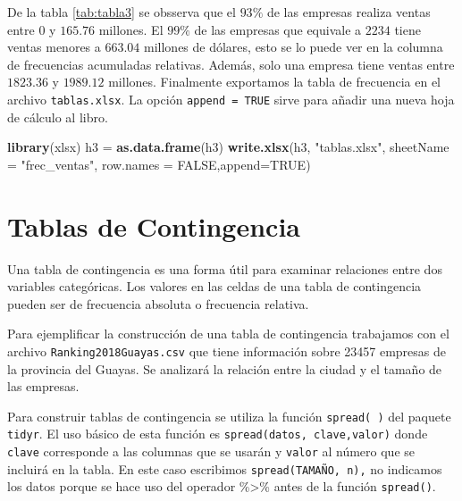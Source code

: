 \documentclass[
]{krantz}
\makeatletter
\newenvironment{Shaded}{\begin{snugshade}}{\end{snugshade}}
\newcommand{\DataTypeTok}[1]{\textcolor[rgb]{0.27,0.27,0.27}{#1}}
\newcommand{\KeywordTok}[1]{\textcolor[rgb]{0.27,0.27,0.27}{\textbf{#1}}}
\newcommand{\NormalTok}[1]{#1}
\newcommand{\OtherTok}[1]{\textcolor[rgb]{0.37,0.37,0.37}{#1}}
\newcommand{\StringTok}[1]{\textcolor[rgb]{0.5,0.5,0.5}{#1}}
\newenvironment{kframe}{%
\medskip{}
\setlength{\fboxsep}{.8em}
 \def\at@end@of@kframe{}%
 \ifinner\ifhmode%
  \def\at@end@of@kframe{\end{minipage}}%
  \begin{minipage}{\columnwidth}%
 \fi\fi%
 \def\FrameCommand##1{\hskip\@totalleftmargin \hskip-\fboxsep
 \colorbox{shadecolor}{##1}\hskip-\fboxsep
     \hskip-\linewidth \hskip-\@totalleftmargin \hskip\columnwidth}%
 \MakeFramed {\advance\hsize-\width
   \@totalleftmargin\z@ \linewidth\hsize
   \@setminipage}}%
 {\par\unskip\endMakeFramed%
 \at@end@of@kframe}
\renewenvironment{Shaded}{\begin{kframe}}{\end{kframe}}
\makeatother
\begin{document}
De la tabla \ref{tab:tabla3} se obsserva que el \(93\%\) de las empresas realiza ventas entre 0 y \(165.76\) millones. El \(99\%\) de las empresas que equivale a \(2234\) tiene ventas menores a \(663.04\) millones de dólares, esto se lo puede ver en la columna de frecuencias acumuladas relativas. Además, solo una empresa tiene ventas entre \(1823.36\) y \(1989.12\) millones. Finalmente exportamos la tabla de frecuencia en el archivo \texttt{tablas.xlsx}. La opción \texttt{append\ =\ TRUE} sirve para añadir una nueva hoja de cálculo al libro.

\begin{Shaded}
\begin{Highlighting}[]
\KeywordTok{library}\NormalTok{(xlsx)}
\NormalTok{h3 =}\StringTok{ }\KeywordTok{as.data.frame}\NormalTok{(h3)}
\KeywordTok{write.xlsx}\NormalTok{(h3, }\StringTok{"tablas.xlsx"}\NormalTok{, }\DataTypeTok{sheetName =} \StringTok{"frec_ventas"}\NormalTok{, }\DataTypeTok{row.names =} \OtherTok{FALSE}\NormalTok{,}\DataTypeTok{append=}\OtherTok{TRUE}\NormalTok{)}
\end{Highlighting}
\end{Shaded}

\hypertarget{tablas-de-contingencia}{%
\section{Tablas de Contingencia}\label{tablas-de-contingencia}}

Una tabla de contingencia es una forma útil para examinar relaciones entre dos variables categóricas. Los valores en las celdas de una tabla de contingencia pueden ser de frecuencia absoluta o frecuencia relativa.

Para ejemplificar la construcción de una tabla de contingencia trabajamos con el archivo \texttt{Ranking2018Guayas.csv} que tiene información sobre 23457 empresas de la provincia del Guayas. Se analizará la relación entre la ciudad y el tamaño de las empresas.

Para construir tablas de contingencia se utiliza la función \texttt{spread(\ )} del paquete \texttt{tidyr}. El uso básico de esta función es \texttt{spread(datos,\ clave,valor)} donde \texttt{clave} corresponde a las columnas que se usarán y \texttt{valor} al número que se incluirá en la tabla. En este caso escribimos \texttt{spread(TAMAÑO,\ n),} no indicamos los datos porque se hace uso del operador \%\textgreater{}\% antes de la función \texttt{spread()}.
\end{document}
